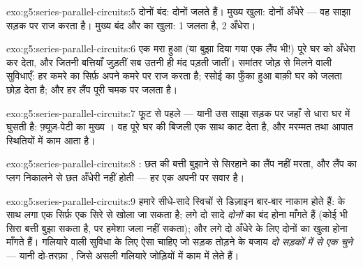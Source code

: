 \begin{solution}{exo:g5:series-parallel-circuits:5}
दोनों बंद: दोनों  जलते हैं। मुख्य खुला: दोनों अँधेरे --- वह साझा
सड़क पर राज करता है। मुख्य बंद और  का  खुला:  1 जलता है,
 2 अँधेरा।
\end{solution}

\begin{solution}{exo:g5:series-parallel-circuits:6}
 एक मरा हुआ  (या बुझा दिया गया एक लैंप भी!) पूरे घर को
अँधेरा कर देता, और जितनी बत्तियाँ जुड़तीं सब उतनी ही मंद पड़ती जातीं।
समांतर जोड़ से मिलने वाली सुविधाएँ: हर कमरे का  सिर्फ़ अपने कमरे
पर राज करता है; रसोई का फुँका हुआ  बाक़ी घर को जलता छोड़ देता है;
और हर लैंप पूरी चमक पर जलता है।
\end{solution}

\begin{solution}{exo:g5:series-parallel-circuits:7}
फूट से पहले --- यानी उस साझा सड़क पर जहाँ से धारा घर में घुसती है:
फ़्यूज़-पेटी का मुख्य । वह पूरे घर की बिजली एक साथ काट देता है,
और मरम्मत तथा आपात स्थितियों में काम आता है।
\end{solution}

\begin{solution}{exo:g5:series-parallel-circuits:8}
: छत की बत्ती बुझाने से सिरहाने का लैंप नहीं मरता, और लैंप
का प्लग निकालने से छत अँधेरी नहीं होती --- हर एक अपनी  पर सवार
है।
\end{solution}

\begin{solution}{exo:g5:series-parallel-circuits:9}
हमारे सीधे-सादे स्विचों से डिज़ाइन बार-बार नाकाम होते हैं:  के साथ
 लगा एक  सिर्फ़ एक सिरे से खोला जा सकता है; 
लगे दो सादे  \emph{दोनों} का बंद होना माँगते हैं (कोई भी सिरा
बत्ती बुझा सकता है, पर हमेशा जला नहीं सकता); और  लगे दो
 अँधेरे के लिए दोनों का खुला होना माँगते हैं। गलियारे वाली
सुविधा के लिए ऐसा  चाहिए जो सड़क तोड़ने के बजाय \emph{दो सड़कों
में से एक चुने} --- यानी दो-तरफ़ा , जिसे असली गलियारे जोड़ियों
में काम में लेते हैं।
\end{solution}

